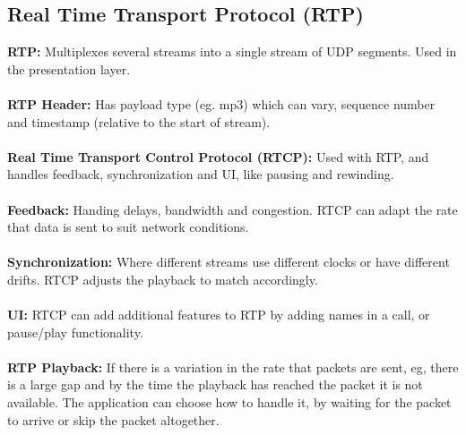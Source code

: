 \documentclass[a4paper,10pt]{article}
\begin{document}
\subsection{Real Time Transport Protocol (RTP)}
\textcolor{PineGreen}{\textbf{RTP:}} Multiplexes several streams into a single stream of UDP segments. Used in the presentation layer.\\\\
\textcolor{PineGreen}{\textbf{RTP Header:}} Has payload type (eg. mp3) which can vary, sequence number and timestamp (relative to the start of stream). \\\\ 
\textcolor{PineGreen}{\textbf{Real Time Transport Control Protocol (RTCP):}} Used with RTP, and handles feedback, synchronization and UI, like pausing and rewinding. \\\\
\textcolor{PineGreen}{\textbf{Feedback:}} Handing delays, bandwidth and congestion. RTCP can adapt the rate that data is sent to suit network conditions. \\\\
\textcolor{PineGreen}{\textbf{Synchronization:}} Where different streams use different clocks or have different drifts. RTCP adjusts the playback to match accordingly. \\\\
\textcolor{PineGreen}{\textbf{UI:}} RTCP can add additional features to RTP by adding names in a call, or pause/play functionality. \\\\
\textcolor{PineGreen}{\textbf{RTP Playback:}} If there is a variation in the rate that packets are sent, eg, there is a large gap and by the time the playback has reached the packet it is not available. The application can choose how to handle it, by waiting for the packet to arrive or skip the packet altogether. 
\end{document}
